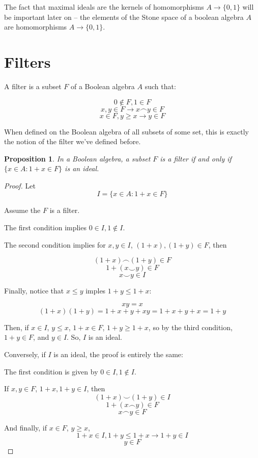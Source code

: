 \documentclass{article}
\newtheorem*{proposition}{Proposition}
\begin{document}
      The fact that maximal ideals are the kernels of homomorphisms $A
      \rightarrow\{0,1\}$ will be important later on -- the elements of the
      Stone space of a boolean algebra $A$ are homomorphisms $A \to \{0,1\}$.

    \section{Filters}

      A filter is a subset $F$ of a Boolean algebra $A$ such that:

      \[0 \notin F, 1 \in F\]
      \[x, y \in F \rightarrow x \frown y \in F\]
      \[x \in F, y \geq x \rightarrow y \in F\]

      When defined on the Boolean algebra of all subsets of some set, this is
      exactly the notion of the filter we've defined before.

      \begin{proposition}

      In a Boolean algebra, a subset $F$ is a filter if and only if $\{x \in
      A: 1+x \in F\}$ is an ideal.

      \end{proposition}

      \begin{proof}

      Let \[I = \{x \in A: 1+x \in F\}\]

      Assume the $F$ is a filter.

      The first condition implies $0 \in I, 1 \notin I$.

      The second condition implies for $x, y \in I$, $(1+x), (1+y) \in F$, then

      \[(1+x) \frown (1+y) \in F\]
      \[1 + (x \smile y) \in F\]
      \[x \smile y \in I\]

      Finally, notice that $x \leq y$ imples $1+y \leq 1+x$:

      \[xy = x\]
      \[(1+x)(1+y) = 1 + x + y + xy = 1 + x + y + x = 1 + y\]

      Then, if $x \in
      I$, $y \leq x$, $1+x \in F$, $1+y \geq 1+x$, so by the third condition,
      $1+y \in F$, and $y \in I$.  So, $I$ is an ideal.

      Conversely, if $I$ is an ideal, the proof is entirely the same:

      The first condition is given by $0 \in I, 1 \notin I$.

      If $x, y \in F$, $1+x, 1+y \in I$, then \[(1+x) \smile (1+y) \in I\] \[1 +
      (x \frown y) \in F\] \[x \frown y \in F\]

      And finally, if $x \in F$, $y \geq x$, \[1+x \in I, 1+y \leq 1+x
      \rightarrow 1+y \in I\] \[y \in F\]
      \end{proof}
\end{document}
